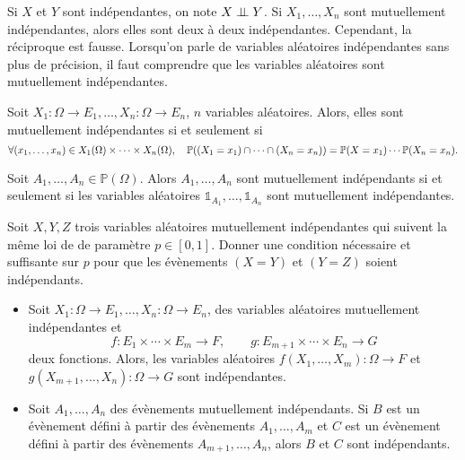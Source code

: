 \documentclass{magnolia}
\begin{document}
\begin{remarques}
\remarque Si $X$ et $Y$ sont indépendantes, on note $X \perp \!\!\! \perp Y$.
\remarque Si $X_1,\ldots,X_n$ sont mutuellement indépendantes, alors elles sont
  deux à deux indépendantes. Cependant, la réciproque est fausse. Lorsqu'on parle de variables aléatoires
  indépendantes sans plus de précision, il faut comprendre que les variables aléatoires sont
  mutuellement indépendantes.
\end{remarques}

\begin{proposition}
Soit $X_1:\Omega\to E_1,\ldots,X_n:\Omega\to E_n$, $n$ variables aléatoires. Alors, elles sont mutuellement
indépendantes si et seulement si
\[\forall (x_1,\ldots,x_n)\in X_1(\Omega)\times\cdots\times X_n(\Omega),\quad
  \mathbb{P}((X_1=x_1)\cap\cdots\cap(X_n=x_n))=\mathbb{P}(X=x_1)\cdots\mathbb{P}(X_n=x_n).\] 
\end{proposition}

\begin{remarqueUnique}
\remarque Soit $A_1,\ldots,A_n\in\mathbb{P}(\Omega)$. Alors $A_1,\ldots,A_n$ sont mutuellement
  indépendants si et seulement si les variables aléatoires $\mathds{1}_{A_1},\ldots,\mathds{1}_{A_n}$
  sont mutuellement indépendantes.
\end{remarqueUnique}

\begin{exoUnique}
\exo Soit $X,Y,Z$ trois variables aléatoires mutuellement
  indépendantes qui suivent la même loi de
   de paramètre $p\in[0,1]$. Donner une condition nécessaire et
  suffisante sur $p$ pour que les évènements $(X=Y)$ et $(Y=Z)$ soient
  indépendants.
\end{exoUnique}

\begin{proposition}[nom={Lemme des coalitions}]
\begin{itemize}
\item 
Soit $X_1:\Omega\to E_1,\ldots,X_n:\Omega\to E_n$, des variables aléatoires mutuellement
indépendantes et
\[f:E_1\times\cdots\times E_m\to F,\qquad g:E_{m+1}\times\cdots\times E_n\to G\]
deux fonctions. Alors, les variables aléatoires $f(X_1,\ldots,X_m):\Omega\to F$ et
$g(X_{m+1},\ldots,X_n):\Omega\to G$ sont indépendantes. 
\item Soit $A_1,\ldots,A_n$ des évènements mutuellement indépendants. Si $B$ est un
 évènement défini à partir des évènements $A_1,\ldots,A_m$ et $C$ est un évènement
 défini à partir des évènements $A_{m+1},\ldots,A_n$, alors $B$ et $C$ sont
 indépendants.
\end{itemize}
\end{proposition}
\end{document}
